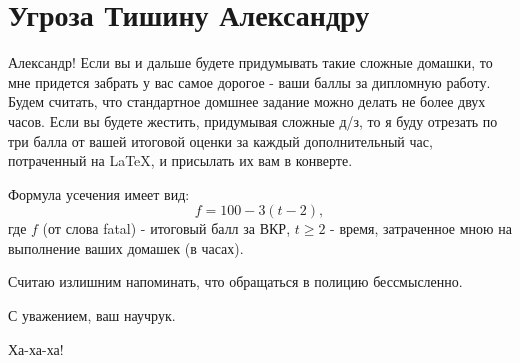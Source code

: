 \documentclass[12pt, a4paper]{article}
\begin{document}
	
\setcounter{section}{2}
	\section{Угроза Тишину Александру}
	
Александр! Если вы и дальше будете придумывать такие сложные домашки, то мне придется забрать у вас самое дорогое - ваши баллы за дипломную работу. Будем считать, что стандартное домшнее задание можно делать не более двух часов. Если вы будете жестить, придумывая сложные д/з, то я буду отрезать по три балла от вашей итоговой оценки за каждый дополнительный час, потраченный на \LaTeX, и присылать их вам в конверте.
 
Формула усечения имеет вид: $$f=100-3(t-2),$$ где $f$ (от слова fatal) - итоговый балл за ВКР, $t\ge2$ - время, затраченное мною на выполнение ваших домашек (в часах).

Считаю излишним напоминать, что обращаться в полицию бессмысленно.

С уважением, ваш научрук.

Ха-ха-ха!

	
	
\end{document}
